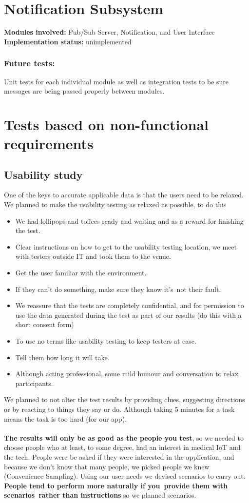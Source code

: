 \documentclass[12pt]{article}
\begin{document}
{	\section{Notification Subsystem }
	\textbf{Modules involved:} Pub/Sub Server, Notification, and User Interface \\
	\textbf{Implementation status:} unimplemented \\
	\subsubsection{Future tests:}
	Unit tests for each individual module as well as integration tests to be sure messages are being passed properly between modules. 

	\section{Tests based on non-functional requirements}
	\subsection{Usability study}
	One of the keys to accurate applicable data is that the users need to be relaxed. We planned to make the usability testing as relaxed as possible, to do this
		\begin{itemize}
		\item We had lollipops and toffees ready and waiting and as a reward for finishing the test. 
		\item Clear instructions on how to get to the usability testing location, we meet with testers outside IT and took them to the venue. 
		\item Get the user familiar with the environment.
		\item If they can't do something, make sure they know it's not their fault. 
		\item We reassure that the tests are completely confidential, and for permission to use the data generated during the test as part of our results (do this with a short consent form) 
		\item To use no terms like usability testing to keep testers at ease.
		\item Tell them how long it will take.
		\item Although acting professional, some mild humour and conversation to relax participants.
		\end{itemize} 
		We planned to not alter the test results by providing clues, suggesting directions or by reacting to things they say or do. Although taking 5 minutes for a task means the task is too hard (for our app). \\ \\
		\textbf{The results will only be as good as the people you test}, so we needed to choose people who at least, to some degree, had an interest in medical IoT and the tech. People were be asked if they were interested in the application, and because we don’t know that many people, we picked people we knew (Convenience Sampling). Using our user needs we devised scenarios to carry out. \textbf{People tend to perform more naturally if you provide them with scenarios rather than instructions} so we planned scenarios.
}
\end{document}
